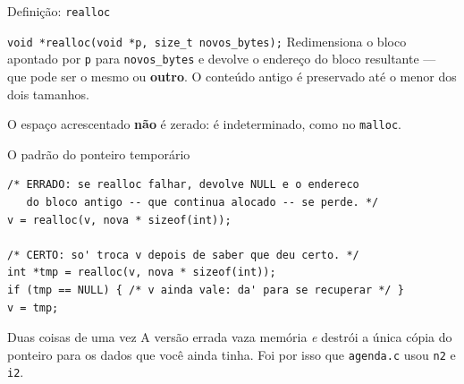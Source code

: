 \documentclass[aspectratio=169]{beamer}
\begin{document}
\begin{frame}{Definição: \texttt{realloc}}
  \begin{block}{\texttt{void *realloc(void *p, size\_t novos\_bytes);}}
    Redimensiona o bloco apontado por \texttt{p} para \texttt{novos\_bytes} e
    devolve o endereço do bloco resultante --- que pode ser o mesmo ou
    \textbf{outro}. O conteúdo antigo é preservado até o menor dos dois tamanhos.
  \end{block}
  \begin{center}
  \end{center}
  \begin{center}\small
  O espaço acrescentado \textbf{não} é zerado: é indeterminado, como no \texttt{malloc}.
  \end{center}
\end{frame}

\begin{frame}[fragile]{O padrão do ponteiro temporário}
\begin{lstlisting}[basicstyle=\ttfamily\scriptsize]
/* ERRADO: se realloc falhar, devolve NULL e o endereco
   do bloco antigo -- que continua alocado -- se perde. */
v = realloc(v, nova * sizeof(int));

/* CERTO: so' troca v depois de saber que deu certo. */
int *tmp = realloc(v, nova * sizeof(int));
if (tmp == NULL) { /* v ainda vale: da' para se recuperar */ }
v = tmp;
\end{lstlisting}
  \begin{alertblock}{Duas coisas de uma vez}
    A versão errada vaza memória \emph{e} destrói a única cópia do ponteiro para
    os dados que você ainda tinha. Foi por isso que \texttt{agenda.c} usou
    \texttt{n2} e \texttt{i2}.
  \end{alertblock}
\end{frame}
\end{document}
